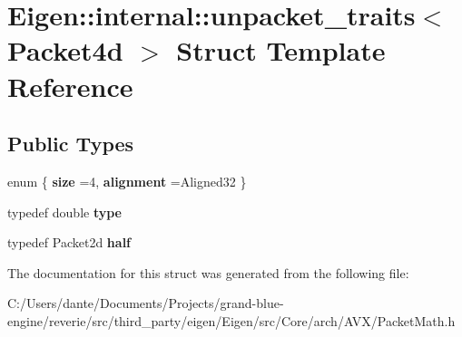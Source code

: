 \hypertarget{struct_eigen_1_1internal_1_1unpacket__traits_3_01_packet4d_01_4}{}\section{Eigen\+::internal\+::unpacket\+\_\+traits$<$ Packet4d $>$ Struct Template Reference}
\label{struct_eigen_1_1internal_1_1unpacket__traits_3_01_packet4d_01_4}
\subsection*{Public Types}
\begin{DoxyCompactItemize}
\item 
\mbox{\label{struct_eigen_1_1internal_1_1unpacket__traits_3_01_packet4d_01_4_a8f78da77edb56e658e954237ce59f571}} 
enum \{ {\bfseries size} =4, 
{\bfseries alignment} =Aligned32
 \}
\item 
\mbox{\label{struct_eigen_1_1internal_1_1unpacket__traits_3_01_packet4d_01_4_a5d4b00a7b2e32823f98d5512ae0a3232}} 
typedef double {\bfseries type}
\item 
\mbox{\label{struct_eigen_1_1internal_1_1unpacket__traits_3_01_packet4d_01_4_a3ab8dc625e16c478ef0373ba62544827}} 
typedef Packet2d {\bfseries half}
\end{DoxyCompactItemize}


The documentation for this struct was generated from the following file\+:\begin{DoxyCompactItemize}
\item 
C\+:/\+Users/dante/\+Documents/\+Projects/grand-\/blue-\/engine/reverie/src/third\+\_\+party/eigen/\+Eigen/src/\+Core/arch/\+A\+V\+X/Packet\+Math.\+h\end{DoxyCompactItemize}
